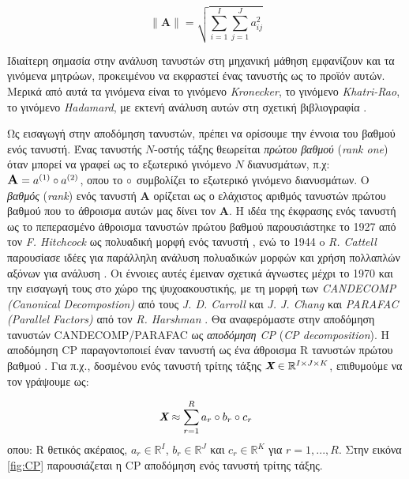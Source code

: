 {\Large\begin{equation}
    \| \textbf{A} \| = \sqrt{\sum_{i=1}^{I}\sum_{j=1}^{J} a_{ij}^2}
\end{equation}}

Ιδιαίτερη σημασία στην ανάλυση τανυστών στη μηχανική μάθηση εμφανίζουν και τα γινόμενα μητρώων, προκειμένου να εκφραστεί ένας τανυστής ως το προϊόν αυτών. Μερικά από αυτά τα γινόμενα είναι το γινόμενο \textit{Kronecker}, το γινόμενο \textit{Khatri-Rao}, το γινόμενο \textit{Hadamard}, με εκτενή ανάλυση αυτών στη σχετική βιβλιογραφία \cite{Liu2008}. 

\medskip
Ως εισαγωγή στην αποδόμηση τανυστών, πρέπει να ορίσουμε την έννοια του βαθμού ενός τανυστή. Ένας τανυστής $N$-οστής τάξης θεωρείται \textit{πρώτου βαθμού} (\textit{rank one}) όταν μπορεί να γραφεί ως το εξωτερικό γινόμενο $N$ διανυσμάτων, π.χ: $\large{\textbf{A} = a^{(1)} \circ a^{(2)}}$, οπου το $\large{\circ}$ συμβολίζει το εξωτερικό γινόμενο διανυσμάτων. Ο \textit{βαθμός} (\textit{rank}) ενός τανυστή \textbf{A} ορίζεται ως ο ελάχιστος αριθμός τανυστών πρώτου βαθμού που το άθροισμα αυτών μας δίνει τον \textbf{A}. Η ιδέα της έκφρασης ενός τανυστή ως το πεπερασμένο άθροισμα τανυστών πρώτου βαθμού παρουσιάστηκε το 1927 από τον \textit{F. Hitchcock} ως πολυαδική μορφή ενός τανυστή \cite{Hitchcock1927}, ενώ το 1944 o \textit{R. Cattell} παρουσίασε ιδέες για παράλληλη ανάλυση πολυαδικών μορφών και χρήση πολλαπλών αξόνων για ανάλυση \cite{Cattell1944}. Οι έννοιες αυτές έμειναν σχετικά άγνωστες μέχρι το 1970 και την εισαγωγή τους στο χώρο της ψυχοακουστικής, με τη μορφή των \textit{CANDECOMP (Canonical Decompostion)} από τους \textit{J. D. Carroll} και \textit{J. J. Chang} \cite{Carroll1970} και \textit{PARAFAC (Parallel Factors)} από τον \textit{R. Harshman} \cite{harshman1972}. Θα αναφερόμαστε στην αποδόμηση τανυστών CANDECOMP/PARAFAC ως \textit{αποδόμηση CP} (\textit{CP decomposition}). Η αποδόμηση CP παραγοντοποιεί έναν τανυστή ως ένα άθροισμα R τανυστών πρώτου βαθμού \cite{Papastergiou2019} \cite{Papastergiou2018}. Για π.χ., δοσμένου ενός τανυστή τρίτης τάξης $\textit{\textbf{X}} \in \mathbb{R}^{I \times J \times K}$, επιθυμούμε να τον γράψουμε ως: 

{\Large
\begin{equation}
    \textit{\textbf{X}} \approx \sum_{r=1}^{R}a_r \circ b_r \circ c_r
\end{equation}}
οπου: R θετικός ακέραιος, $a_r \in \mathbb{R}^I$, $b_r \in \mathbb{R}^J$ και $c_r \in \mathbb{R}^K$ για \newline$r = 1,...,R$. Στην εικόνα \ref{fig:CP} παρουσιάζεται η CP αποδόμηση ενός τανυστή τρίτης τάξης.

